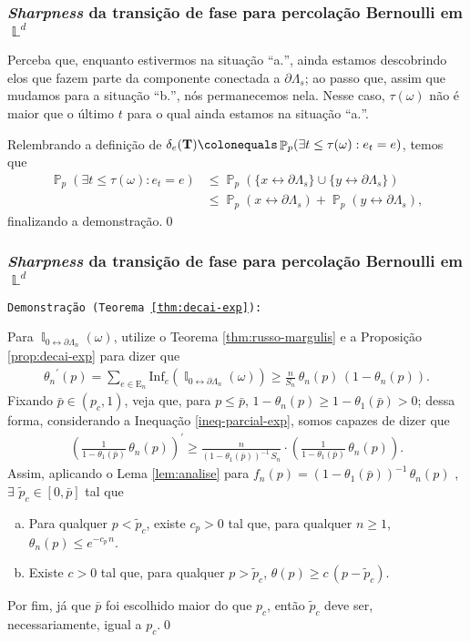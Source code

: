 \documentclass[9pt]{beamer}
\theoremstyle{definition} %
\DeclareMathOperator{\PX}{\mathbb{P}} %
\DeclareMathOperator{\IX}{\mathbb{I}} %
\DeclareMathOperator{\LX}{\mathbb{L}} %
\begin{document}
	\begin{frame}[t]
	\frametitle{\textit{Sharpness} da transição de fase para percolação Bernoulli em $\LX^d$}
		Perceba que, enquanto estivermos na situação ``a$.$'', ainda estamos descobrindo elos que fazem parte da componente conectada a $\partial\Lambda_s$; ao passo que, assim que mudamos para a situação ``b$.$'', nós permanecemos nela. Nesse caso, $\tau(\omega)$ não é maior que o último $t$ para o qual ainda estamos na situação ``a$.$''.
		
		\par Relembrando a definição de $\delta_e(\text{\textbf{T}}) \colonequals \PX_p(\exists t \leq \tau(\omega) : e_t = e)$, temos que
		\begin{align*}
		\PX_p(\exists t \leq \tau(\omega) : e_t = e) &\leq \PX_p\left(\{x \leftrightarrow \partial\Lambda_s\} \cup \{y \leftrightarrow \partial\Lambda_s\}\right) \\
		&\leq \PX_p(x \leftrightarrow \partial\Lambda_s) + \PX_p(y \leftrightarrow \partial\Lambda_s),
		\end{align*}
		finalizando a demonstração.\hspace{\fill}\qed
	\end{frame}

	\begin{frame}[t]
	\frametitle{\textit{Sharpness} da transição de fase para percolação Bernoulli em $\LX^d$}
		\texttt{Demonstração (Teorema \ref{thm:decai-exp}):}
	
		Para $\IX_{0 \leftrightarrow \partial\Lambda_n}(\omega)$, utilize o Teorema \ref{thm:russo-margulis} e a Proposição \ref{prop:decai-exp} para dizer que
		\begin{align} \label{ineq-parcial-exp}
		{\theta_n}^{\prime}(p) = \sum_{e \in \text{E}_n}\text{Inf}_e(\IX_{0 \leftrightarrow \partial\Lambda_n}(\omega)) \geq \frac{n}{S_n} \, \theta_n(p) \, (1 - \theta_n(p)).
		\end{align}\pause
		 Fixando $\bar{p} \in (p_c, 1)$, veja que, para $p \leq \bar{p}$, $1 - \theta_n(p) \geq 1 - \theta_1(\bar{p}) > 0$; dessa forma, considerando a Inequação \ref{ineq-parcial-exp}, somos capazes de dizer que
		\begin{align*}
		\left(\frac{1}{1 - \theta_1(\bar{p})}\,\theta_n(p)\right)^{\prime} \geq \frac{n}{(1 - \theta_1(\bar{p}))^{-1}\, S_n} \cdot \left(\frac{1}{1 - \theta_1(\bar{p})}\,\theta_n(p)\right).
		\end{align*}\pause
		Assim, aplicando o Lema \ref{lem:analise} para $f_n(p) = (1 - \theta_1(\bar{p}))^{-1}\,\theta_n(p)$ , $\exists$ $\tilde{p}_c \in [0, \bar{p}]$ tal que	\begin{enumerate}[a.]
			\item Para qualquer $p < \tilde{p}_c$, existe $c_p > 0$ tal que, para qualquer $n \geq 1$, $\theta_n(p) \leq e^{-c_p\,n}$.
			\item Existe $c > 0$ tal que, para qualquer $p > \tilde{p}_c$, $\theta(p) \geq c\,(p - \tilde{p}_c)$.
		\end{enumerate}
		Por fim, já que $\bar{p}$ foi escolhido maior do que $p_c$, então $\tilde{p}_c$ deve ser, necessariamente, igual a $p_c$.\hspace{\fill}\qed
	\end{frame}
\end{document}

